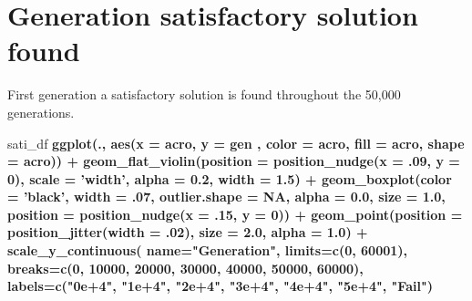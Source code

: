 \documentclass[]{book}
\newenvironment{Shaded}{\begin{snugshade}}{\end{snugshade}}
\newcommand{\DataTypeTok}[1]{\textcolor[rgb]{0.13,0.29,0.53}{#1}}
\newcommand{\DecValTok}[1]{\textcolor[rgb]{0.00,0.00,0.81}{#1}}
\newcommand{\FloatTok}[1]{\textcolor[rgb]{0.00,0.00,0.81}{#1}}
\newcommand{\KeywordTok}[1]{\textcolor[rgb]{0.13,0.29,0.53}{\textbf{#1}}}
\newcommand{\NormalTok}[1]{#1}
\newcommand{\OperatorTok}[1]{\textcolor[rgb]{0.81,0.36,0.00}{\textbf{#1}}}
\newcommand{\OtherTok}[1]{\textcolor[rgb]{0.56,0.35,0.01}{#1}}
\newcommand{\StringTok}[1]{\textcolor[rgb]{0.31,0.60,0.02}{#1}}
\begin{document}
\hypertarget{generation-satisfactory-solution-found-1}{%
\section{Generation satisfactory solution found}\label{generation-satisfactory-solution-found-1}}

First generation a satisfactory solution is found throughout the 50,000 generations.

\begin{Shaded}
\begin{Highlighting}[]
\NormalTok{sati_df }\OperatorTok{%>%}
\StringTok{  }\KeywordTok{ggplot}\NormalTok{(., }\KeywordTok{aes}\NormalTok{(}\DataTypeTok{x =}\NormalTok{ acro, }\DataTypeTok{y =}\NormalTok{ gen , }\DataTypeTok{color =}\NormalTok{ acro, }\DataTypeTok{fill =}\NormalTok{ acro, }\DataTypeTok{shape =}\NormalTok{ acro)) }\OperatorTok{+}
\StringTok{  }\KeywordTok{geom_flat_violin}\NormalTok{(}\DataTypeTok{position =} \KeywordTok{position_nudge}\NormalTok{(}\DataTypeTok{x =} \FloatTok{.09}\NormalTok{, }\DataTypeTok{y =} \DecValTok{0}\NormalTok{), }\DataTypeTok{scale =} \StringTok{'width'}\NormalTok{, }\DataTypeTok{alpha =} \FloatTok{0.2}\NormalTok{, }\DataTypeTok{width =} \FloatTok{1.5}\NormalTok{) }\OperatorTok{+}
\StringTok{  }\KeywordTok{geom_boxplot}\NormalTok{(}\DataTypeTok{color =} \StringTok{'black'}\NormalTok{, }\DataTypeTok{width =} \FloatTok{.07}\NormalTok{, }\DataTypeTok{outlier.shape =} \OtherTok{NA}\NormalTok{, }\DataTypeTok{alpha =} \FloatTok{0.0}\NormalTok{, }\DataTypeTok{size =} \FloatTok{1.0}\NormalTok{, }\DataTypeTok{position =} \KeywordTok{position_nudge}\NormalTok{(}\DataTypeTok{x =} \FloatTok{.15}\NormalTok{, }\DataTypeTok{y =} \DecValTok{0}\NormalTok{)) }\OperatorTok{+}
\StringTok{  }\KeywordTok{geom_point}\NormalTok{(}\DataTypeTok{position =} \KeywordTok{position_jitter}\NormalTok{(}\DataTypeTok{width =} \FloatTok{.02}\NormalTok{), }\DataTypeTok{size =} \FloatTok{2.0}\NormalTok{, }\DataTypeTok{alpha =} \FloatTok{1.0}\NormalTok{) }\OperatorTok{+}
\StringTok{  }\KeywordTok{scale_y_continuous}\NormalTok{(}
    \DataTypeTok{name=}\StringTok{"Generation"}\NormalTok{,}
    \DataTypeTok{limits=}\KeywordTok{c}\NormalTok{(}\DecValTok{0}\NormalTok{, }\DecValTok{60001}\NormalTok{),}
    \DataTypeTok{breaks=}\KeywordTok{c}\NormalTok{(}\DecValTok{0}\NormalTok{, }\DecValTok{10000}\NormalTok{, }\DecValTok{20000}\NormalTok{, }\DecValTok{30000}\NormalTok{, }\DecValTok{40000}\NormalTok{, }\DecValTok{50000}\NormalTok{, }\DecValTok{60000}\NormalTok{),}
    \DataTypeTok{labels=}\KeywordTok{c}\NormalTok{(}\StringTok{"0e+4"}\NormalTok{, }\StringTok{"1e+4"}\NormalTok{, }\StringTok{"2e+4"}\NormalTok{, }\StringTok{"3e+4"}\NormalTok{, }\StringTok{"4e+4"}\NormalTok{, }\StringTok{"5e+4"}\NormalTok{, }\StringTok{"Fail"}\NormalTok{)}
}
\end{Highlighting}
\end{Shaded}
\end{document}
